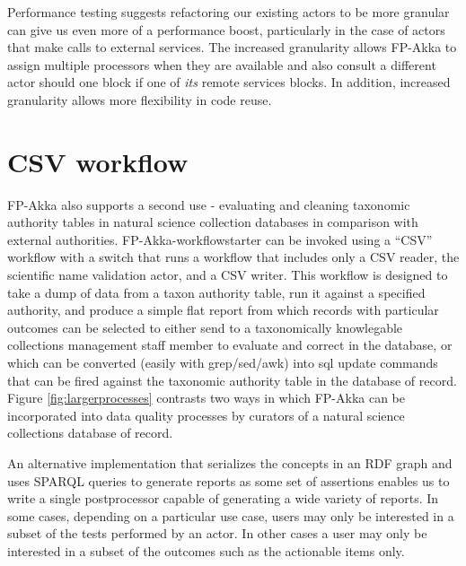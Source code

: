 \documentclass{article}
\begin{document}
Performance testing suggests refactoring our existing actors to be more granular can give us even more of a performance boost, particularly in the case of actors that make calls to external services. The increased granularity allows FP-Akka to assign multiple processors when they are available and also consult a different actor should one block if one of \emph{its} remote services blocks. In addition, increased granularity allows more flexibility in code re\-use.

\section{CSV workflow} \label{CSVWorkflow}

FP-Akka also supports a second use - evaluating and cleaning taxonomic authority tables in natural science collection databases in comparison with external authorities.  FP-Akka-workflowstarter can be invoked using a ``CSV'' workflow with a switch that runs a workflow that includes only a CSV reader, the scientific name validation actor, and a CSV writer.  This workflow is designed to take a dump of data from a taxon authority table, run it against a specified authority, and produce a simple flat report from which records with particular outcomes can be selected to either send to a taxonomically knowlegable collections management staff member to evaluate and correct in the database, or which can be converted (easily with grep/sed/awk) into sql update commands that can be fired against the taxonomic authority table in the database of record.  Figure \ref{fig:largerprocesses} contrasts two ways in which FP-Akka can be incorporated into data quality processes by curators of a natural science collections database of record.

An alternative implementation that serializes the concepts in an RDF graph and uses SPARQL queries to generate reports as some set of assertions enables us to write a single postprocessor capable of generating a wide variety of reports. In some cases, depending on a particular use case, users may only be interested in a subset of the tests performed by an actor. In other cases a user may only be interested in a subset of the outcomes such as the actionable items only.
\end{document}
